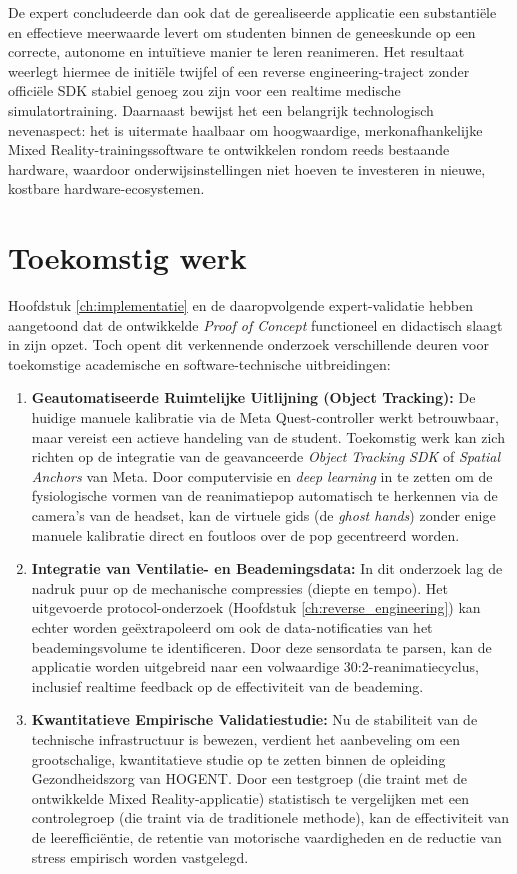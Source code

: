 De expert concludeerde dan ook dat de gerealiseerde applicatie een substantiële en effectieve meerwaarde levert om studenten binnen de geneeskunde op een correcte, 
autonome en intuïtieve manier te leren reanimeren. Het resultaat weerlegt hiermee de initiële twijfel of een reverse engineering-traject zonder officiële SDK stabiel 
genoeg zou zijn voor een realtime medische simulatortraining. Daarnaast bewijst het een belangrijk technologisch nevenaspect: het is uitermate haalbaar om hoogwaardige, 
merkonafhankelijke Mixed Reality-trainingssoftware te ontwikkelen rondom reeds bestaande hardware, waardoor onderwijsinstellingen niet hoeven te investeren 
in nieuwe, kostbare hardware-ecosystemen.

\section{Toekomstig werk}
\label{sec:toekomstig_werk}

Hoofdstuk \ref{ch:implementatie} en de daaropvolgende expert-validatie hebben aangetoond dat de ontwikkelde \textit{Proof of Concept} functioneel en didactisch slaagt in zijn opzet. 
Toch opent dit verkennende onderzoek verschillende deuren voor toekomstige academische en software-technische uitbreidingen:

\begin{enumerate}
    \item \textbf{Geautomatiseerde Ruimtelijke Uitlijning (Object Tracking):} De huidige manuele kalibratie via de Meta Quest-controller werkt 
    betrouwbaar, maar vereist een actieve handeling van de student. Toekomstig werk kan zich richten op de integratie van de geavanceerde 
    \textit{Object Tracking SDK} of \textit{Spatial Anchors} van Meta. Door computervisie en \textit{deep learning} in te zetten om de 
    fysiologische vormen van de reanimatiepop automatisch te herkennen via de camera's van de headset, kan de virtuele gids 
    (de \textit{ghost hands}) zonder enige manuele kalibratie direct en foutloos over de pop gecentreerd worden.
    \item \textbf{Integratie van Ventilatie- en Beademingsdata:} In dit onderzoek lag de nadruk puur op de mechanische compressies 
    (diepte en tempo). Het uitgevoerde protocol-onderzoek (Hoofdstuk \ref{ch:reverse_engineering}) kan echter worden geëxtrapoleerd om 
    ook de data-notificaties van het beademingsvolume te identificeren. Door deze sensordata te parsen, kan de applicatie worden uitgebreid 
    naar een volwaardige 30:2-reanimatiecyclus, inclusief realtime feedback op de effectiviteit van de beademing.
    \item \textbf{Kwantitatieve Empirische Validatiestudie:} Nu de stabiliteit van de technische infrastructuur is bewezen, verdient het 
    aanbeveling om een grootschalige, kwantitatieve studie op te zetten binnen de opleiding Gezondheidszorg van HOGENT. 
    Door een testgroep (die traint met de ontwikkelde Mixed Reality-applicatie) statistisch te vergelijken met een controlegroep 
    (die traint via de traditionele methode), kan de effectiviteit van de leerefficiëntie, de retentie van motorische vaardigheden en 
    de reductie van stress empirisch worden vastgelegd.
\end{enumerate}